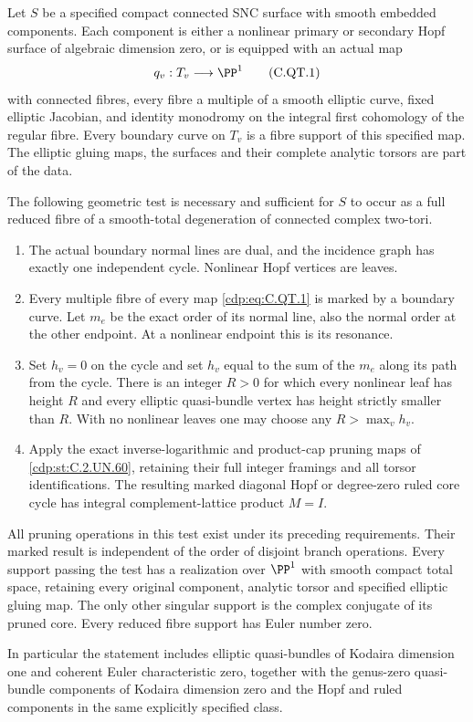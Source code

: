 
\begin{proposition}\label{cdp:st:C.2.UN.62}
Let $S$ be a specified compact connected SNC surface with smooth
embedded components. Each component is either a nonlinear primary
or secondary Hopf surface of algebraic dimension zero, or is
equipped with an actual map
\[
                         q_v:T_v\longrightarrow\PP^1
\tag{C.QT.1}\label{cdp:eq:C.QT.1}
\]
with connected fibres, every fibre a multiple of a smooth elliptic
curve, fixed elliptic Jacobian, and identity monodromy on the
integral first cohomology of the regular fibre. Every boundary
curve on $T_v$ is a fibre support of this specified map. The
elliptic gluing maps, the surfaces and their complete analytic
torsors are part of the data.

The following geometric test is necessary and sufficient for
$S$ to occur as a full reduced fibre of a smooth-total
degeneration of connected complex two-tori.
\begin{enumerate}
\item The actual boundary normal lines are dual, and the incidence
graph has exactly one independent cycle. Nonlinear Hopf vertices
are leaves.
\item Every multiple fibre of every map \eqref{cdp:eq:C.QT.1} is marked by
a boundary curve. Let $m_e$ be the exact order of its normal
line, also the normal order at the other endpoint. At a
nonlinear endpoint this is its resonance.
\item Set $h_v=0$ on the cycle and set $h_v$ equal to the sum
of the $m_e$ along its path from the cycle. There is an integer
$R>0$ for which every nonlinear leaf has height $R$ and every
elliptic quasi-bundle vertex has height strictly smaller than
$R$. With no nonlinear leaves one may choose any
$R>\max_v h_v$.
\item Apply the exact inverse-logarithmic and product-cap
pruning maps of \ref{cdp:st:C.2.UN.60}, retaining their full integer
framings and all torsor identifications. The resulting
marked diagonal Hopf or degree-zero ruled core cycle has
integral complement-lattice product $M=I$.
\end{enumerate}
All pruning operations in this test exist under its preceding
requirements. Their marked result is independent of the order
of disjoint branch operations. Every support passing the test
has a realization over $\PP^1$ with smooth compact total space,
retaining every original component, analytic torsor and
specified elliptic gluing map. The only other singular support
is the complex conjugate of its pruned core. Every reduced
fibre support has Euler number zero.

In particular the statement includes elliptic quasi-bundles
of Kodaira dimension one and coherent Euler characteristic
zero, together with the genus-zero quasi-bundle components
of Kodaira dimension zero and the Hopf and ruled components
in the same explicitly specified class.
\end{proposition}


